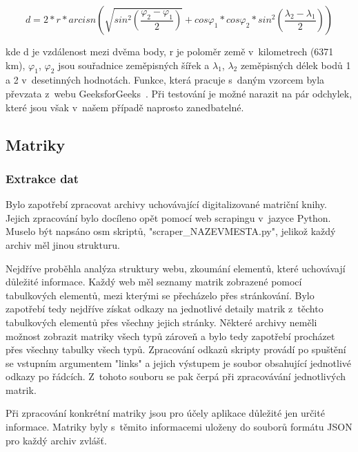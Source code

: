 \begin{equation} \label{Haversinův vzorec}
	d = 2*r*arcisn(\sqrt{sin^2(\frac{\varphi_{2} - \varphi_{1}}{2})}+cos\varphi_{1}*cos\varphi_{2}*sin^2(\frac{\lambda _{2} - \lambda_{1}}{2}))
\end{equation}

 
kde d je vzdálenost mezi dvěma body, r je poloměr země v~kilometrech (6371 km), $\varphi_{1}$, $\varphi_{2}$ jsou souřadnice zeměpisných šířek a $\lambda_{1}$, $\lambda_{2}$ zeměpisných délek bodů 1 a 2 v~desetinných hodnotách. Funkce, která pracuje s~daným vzorcem byla převzata z~webu GeeksforGeeks~\cite{Haversine_function}. Při testování je možné narazit na pár odchylek, které jsou však v~našem případě naprosto zanedbatelné.

\subsection{Matriky}
\subsubsection{Extrakce dat}
Bylo zapotřebí zpracovat archivy uchovávající digitalizované matriční knihy. Jejich zpracování bylo docíleno opět pomocí web scrapingu v~jazyce Python. Muselo být napsáno osm skriptů, "scraper\_NAZEVMESTA.py", jelikož každý archiv měl jinou strukturu. 

Nejdříve proběhla analýza struktury webu, zkoumání elementů, které uchovávají důležité informace. Každý web měl seznamy matrik zobrazené pomocí tabulkových elementů, mezi kterými se přecházelo přes stránkování. Bylo zapotřebí tedy nejdříve získat odkazy na jednotlivé detaily matrik z~těchto tabulkových elementů přes všechny jejich stránky. Některé archivy neměli možnost zobrazit matriky všech typů zároveň a bylo tedy zapotřebí procházet přes všechny tabulky všech typů. Zpracování odkazů skripty provádí po spuštění se vstupním argumentem "links" a jejich výstupem je soubor obsahující jednotlivé odkazy po řádcích. Z~tohoto souboru se pak čerpá při zpracovávání jednotlivých matrik.

Při zpracování konkrétní matriky jsou pro účely aplikace důležité jen určité informace. Matriky byly s~těmito informacemi uloženy do souborů formátu JSON pro každý archiv zvlášť. 

